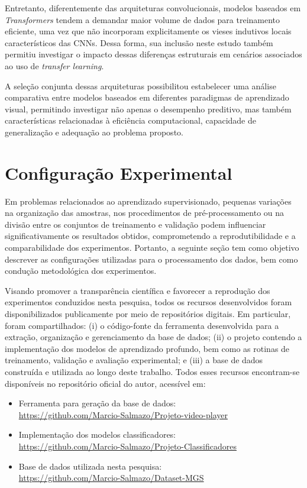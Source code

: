 Entretanto, diferentemente das arquiteturas convolucionais, modelos baseados em \textit{Transformers} tendem a demandar maior volume de dados para treinamento eficiente, uma vez que não incorporam explicitamente os vieses indutivos locais característicos das \acsp{CNN}. Dessa forma, sua inclusão neste estudo também permitiu investigar o impacto dessas diferenças estruturais em cenários associados ao uso de \textit{transfer learning}.

A seleção conjunta dessas arquiteturas possibilitou estabelecer uma análise comparativa entre modelos baseados em diferentes paradigmas de aprendizado visual, permitindo investigar não apenas o desempenho preditivo, mas também características relacionadas à eficiência computacional, capacidade de generalização e adequação ao problema proposto.

\section{Configuração Experimental}

Em problemas relacionados ao aprendizado supervisionado, pequenas variações na organização das amostras, nos procedimentos de pré-processamento ou na divisão entre os conjuntos de treinamento e validação podem influenciar significativamente os resultados obtidos, comprometendo a reprodutibilidade e a comparabilidade dos experimentos. Portanto, a seguinte seção tem como objetivo descrever as configurações utilizadas para o processamento dos dados, bem como condução metodológica dos experimentos.

Visando promover a transparência científica e favorecer a reprodução dos experimentos conduzidos nesta pesquisa, todos os recursos desenvolvidos foram disponibilizados publicamente por meio de repositórios digitais. Em particular, foram compartilhados: (i) o código-fonte da ferramenta desenvolvida para a extração, organização e gerenciamento da base de dados; (ii) o projeto contendo a implementação dos modelos de aprendizado profundo, bem como as rotinas de treinamento, validação e avaliação experimental; e (iii) a base de dados construída e utilizada ao longo deste trabalho. Todos esses recursos encontram-se disponíveis no repositório oficial do autor, acessível em:

\begin{itemize}
	
	\item Ferramenta para geração da base de dados:\\
	\url{https://github.com/Marcio-Salmazo/Projeto-video-player}
	
	\item Implementação dos modelos classificadores:\\
	\url{https://github.com/Marcio-Salmazo/Projeto-Classificadores}
	
	\item Base de dados utilizada nesta pesquisa:\\
	\url{https://github.com/Marcio-Salmazo/Dataset-MGS}
	
\end{itemize}


